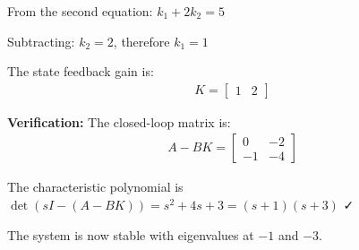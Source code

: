 \documentclass[11pt,a4paper]{article}
\begin{document}
From the second equation: $k_1 + 2k_2 = 5$

Subtracting: $k_2 = 2$, therefore $k_1 = 1$

The state feedback gain is:
\begin{align}
  K = \begin{bmatrix} 1 & 2 \end{bmatrix}
\end{align}

\textbf{Verification:} The closed-loop matrix is:
\begin{align}
  A - BK = \begin{bmatrix} 0 & -2 \\ -1 & -4 \end{bmatrix}
\end{align}

The characteristic polynomial is $\det(sI - (A-BK)) = s^2 + 4s + 3 = (s+1)(s+3)$ ✓

The system is now stable with eigenvalues at $-1$ and $-3$.
\end{document}
